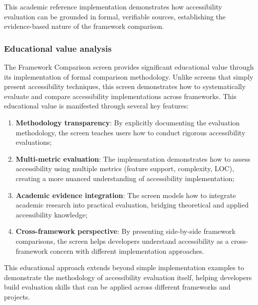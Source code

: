 This academic reference implementation demonstrates how accessibility evaluation can be grounded in formal, verifiable sources, establishing the evidence-based nature of the framework comparison.

\subsubsection{Educational value analysis}

The Framework Comparison screen provides significant educational value through its implementation of formal comparison methodology. Unlike screens that simply present accessibility techniques, this screen demonstrates how to systematically evaluate and compare accessibility implementations across frameworks. This educational value is manifested through several key features:

\begin{enumerate}
    \item \textbf{Methodology transparency}: By explicitly documenting the evaluation methodology, the screen teaches users how to conduct rigorous accessibility evaluations;
    
    \item \textbf{Multi-metric evaluation}: The implementation demonstrates how to assess accessibility using multiple metrics (feature support, complexity, LOC), creating a more nuanced understanding of accessibility implementation;
    
    \item \textbf{Academic evidence integration}: The screen models how to integrate academic research into practical evaluation, bridging theoretical and applied accessibility knowledge;
    
    \item \textbf{Cross-framework perspective}: By presenting side-by-side framework comparisons, the screen helps developers understand accessibility as a cross-framework concern with different implementation approaches.
\end{enumerate}

This educational approach extends beyond simple implementation examples to demonstrate the methodology of accessibility evaluation itself, helping developers build evaluation skills that can be applied across different frameworks and projects.

\newpage

